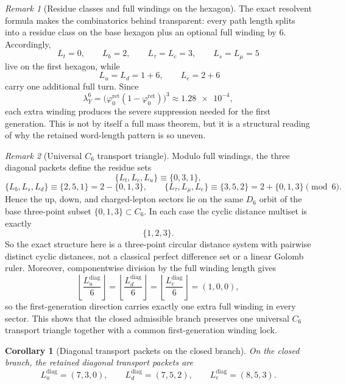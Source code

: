 \documentclass[11pt,a4paper]{article}
\newtheorem{corollary}[theorem]{Corollary}
\theoremstyle{definition}
\theoremstyle{remark}
\newtheorem*{remark}{Remark}
\newcommand{\phiz}{\varphi_0^{\mathrm{ret}}}
\begin{document}
\begin{remark}[Residue classes and full windings on the hexagon]
The exact resolvent formula  makes the combinatorics behind  transparent: every path length splits into a residue class on the base hexagon plus an optional full winding by $6$. Accordingly,
\[
L_t=0,\qquad
L_b=2,\qquad
L_\tau=L_c=3,\qquad
L_s=L_\mu=5
\]
live on the first hexagon, while
\[
\;L_u=L_d=1+6,
\qquad
L_e=2+6
\]
carry one additional full turn. Since
\[
\lambda_Y^6=\bigl(\phiz(1-\phiz)\bigr)^3\approx \num{1.28e-4},
\]
each extra winding produces the severe suppression needed for the first generation. This is not by itself a full mass theorem, but it is a structural reading of why the retained word-length pattern is so uneven.
\end{remark}

\begin{remark}[Universal $C_6$ transport triangle]
Modulo full windings, the three diagonal packets define the residue sets
\[
\{L_t,L_c,L_u\}\equiv\{0,3,1\},
\]
\[
\{L_b,L_s,L_d\}\equiv\{2,5,1\}=2-\{0,1,3\},
\qquad
\{L_\tau,L_\mu,L_e\}\equiv\{3,5,2\}=2+\{0,1,3\}
\pmod 6.
\]
Hence the up, down, and charged-lepton sectors lie on the same $D_6$ orbit of the base three-point subset $\{0,1,3\}\subset C_6$. In each case the cyclic distance multiset is exactly
\[
\{1,2,3\}.
\]
So the exact structure here is a three-point circular distance system with pairwise distinct cyclic distances, not a classical perfect difference set or a linear Golomb ruler.
Moreover, componentwise division by the full winding length gives
\[
\left\lfloor\frac{L_u^{\mathrm{diag}}}{6}\right\rfloor
=
\left\lfloor\frac{L_d^{\mathrm{diag}}}{6}\right\rfloor
=
\left\lfloor\frac{L_e^{\mathrm{diag}}}{6}\right\rfloor
=(1,0,0),
\]
so the first-generation direction carries exactly one extra full winding in every sector. This
shows that the closed admissible branch preserves one universal $C_6$ transport triangle together
with a common first-generation winding lock.
\end{remark}

\begin{corollary}[Diagonal transport packets on the closed branch]
\label{prin:minimal-admissible-transport-packets}
On the closed branch, the retained diagonal transport packets
are
\[
L_u^{\mathrm{diag}}=(7,3,0),
\qquad
L_d^{\mathrm{diag}}=(7,5,2),
\qquad
L_e^{\mathrm{diag}}=(8,5,3).
\]
\end{corollary}
\end{document}
